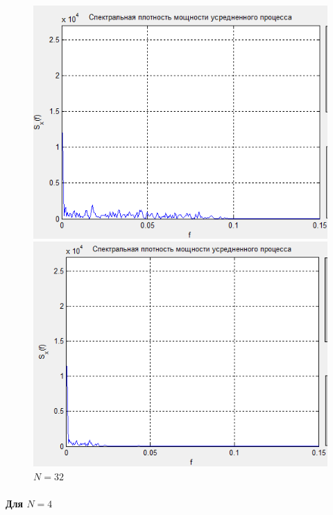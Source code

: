  \begin{figure}[H]
	\begin{minipage}{.45\linewidth}
		\centering
       \includegraphics[width=\linewidth]{fig/fig52}
	\caption*{$N = 4$}
	\end{minipage}
	\begin{minipage}{.45\linewidth}
		\centering
        \includegraphics[width=\linewidth]{fig/fig53}
	\caption*{$N = 32$}
	\end{minipage}
\end{figure}
\paragraph{Для $N=4$}%


